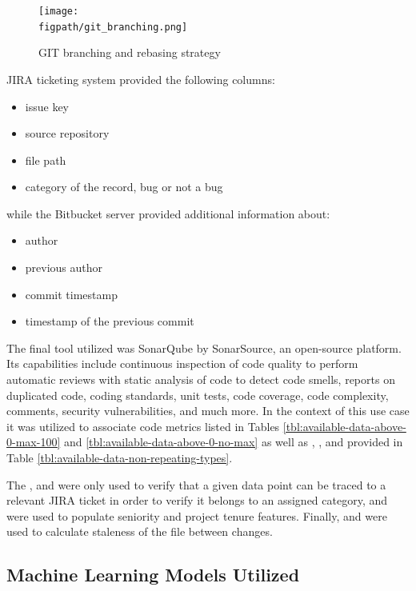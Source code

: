 \begin{figure}[!h]
    \centering
    \texttt{[image: \\figpath/git\_branching.png]}
    \caption{GIT branching and rebasing strategy}
    \label{fig:git-branching-merging-and-rebasing}
\end{figure}

JIRA ticketing system provided the following columns:
\begin{itemize}
    \item issue key
    \item source repository
    \item file path
    \item category of the record, bug or not a bug
\end{itemize}

while the Bitbucket server provided additional information about:
\begin{itemize}\label{lst:design:info-from-bitbucket}
    \item author
    \item previous author
    \item commit timestamp
    \item timestamp of the previous commit
\end{itemize}

The final tool utilized was SonarQube by SonarSource, an open-source platform. Its capabilities include continuous inspection of code quality to perform automatic reviews with static analysis of code to detect code smells, reports on duplicated code, coding standards, unit tests, code coverage, code complexity, comments,  security vulnerabilities, and much more. In the context of this use case it was utilized to associate code metrics listed in Tables \ref{tbl:available-data-above-0-max-100} and \ref{tbl:available-data-above-0-no-max} as well as \files{}, \sqaleDebt{}, \statements{} and \violations{} provided in Table \ref{tbl:available-data-non-repeating-types}.

The \issueKey{}, \sourceRepository{} and \filePath{} were only used to verify that a given data point can be traced to a relevant JIRA ticket in order to verify it belongs to an assigned category, \authorAttrib{} and \prevAuthorAttrib{} were used to populate seniority and project tenure features. Finally, \timestamp{} and \prevTimestamp{} were used to calculate staleness of the file between changes.

\subsection{Machine Learning Models Utilized}

